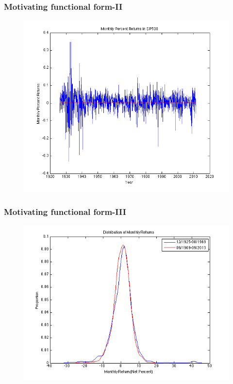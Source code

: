 \documentclass{beamer}
\begin{document}
\begin{frame}
\frametitle[alignment=center]{Motivating functional form-II}
\begin{figure}
\centering
\includegraphics[scale=0.4]{Figures/Sp500MonthlyReturns}
\end{figure}
\end{frame}

\begin{frame}
\frametitle[alignment=center]{Motivating functional form-III}
\begin{figure}
\centering
\includegraphics[scale=0.5]{Figures/DistributionofReturns}
\end{figure}
\end{frame}
\end{document}

